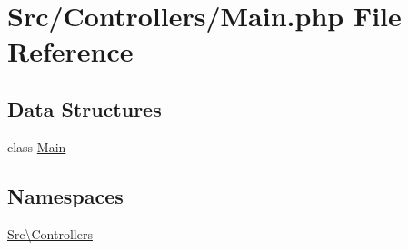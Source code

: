 \hypertarget{_main_8php}{}\section{Src/\+Controllers/\+Main.php File Reference}
\label{_main_8php}
\subsection*{Data Structures}
\begin{DoxyCompactItemize}
\item 
class \hyperlink{class_src_1_1_controllers_1_1_main}{Main}
\end{DoxyCompactItemize}
\subsection*{Namespaces}
\begin{DoxyCompactItemize}
\item 
 \hyperlink{namespace_src_1_1_controllers}{Src\textbackslash{}\+Controllers}
\end{DoxyCompactItemize}
